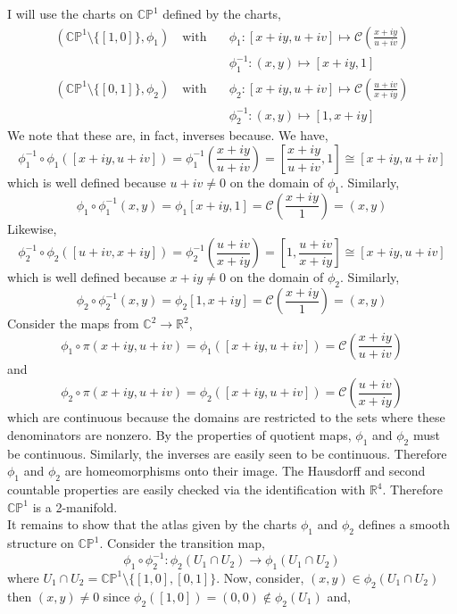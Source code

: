 \documentclass[12pt]{extarticle}
\newcommand{\C}{\mathbb{C}}
\newcommand{\R}{\mathbb{R}}
\newcommand{\sm}{\! \setminus \!}
\newcommand{\CP}{\mathbb{CP}}
\begin{document}
\begin{enumerate}
I will use the charts on $\CP^1$ defined by the charts,
\begin{align*}
(\CP^1 \sm \{[1, 0]\}, \phi_1) \quad \text{with} \quad & \phi_1 : [x + i y, u + i v] \mapsto \mathcal{C}\left(\frac{x + iy}{u + iv}\right)
\\
& \phi_1^{-1} : (x, y) \mapsto [x + i y, 1]
\\
(\CP^1 \sm \{[0, 1]\}, \phi_2) \quad \text{with} \quad & \phi_2 : [x + i y, u + i v] \mapsto \mathcal{C}\left(\frac{u + iv}{x + iy}\right)
\\
& \phi_2^{-1} : (x, y) \mapsto [1, x + i y]
\end{align*}
We note that these are, in fact, inverses because. We have,
\[\phi_1^{-1}\circ \phi_1([x + iy, u + i v]) = \phi_1^{-1}\left(\frac{x + i y}{u + i v}\right) = \left[\frac{x + iy}{u + iv},1\right] \cong [x + iy, u + iv]\]
which is well defined because $u + i v \neq 0$ on the domain of $\phi_1$. Similarly,
\[\phi_1\circ\phi_1^{-1}\left(x, y\right) = \phi_1[x + iy,1] = \mathcal{C} \left(\frac{x + iy}{1}\right) = (x, y)\]
Likewise,
\[\phi_2^{-1}\circ \phi_2([u + iv, x + i y]) = \phi_2^{-1}\left(\frac{u + i v}{x + i y}\right) = \left[1, \frac{u + iv}{x + iy}\right] \cong [x + iy, u + iv]\]
which is well defined because $x + i y \neq 0$ on the domain of $\phi_2$. Similarly,
\[\phi_2 \circ \phi_2^{-1} \left(x, y\right) = \phi_2[1, x + iy] = \mathcal{C} \left(\frac{x + iy}{1}\right) = (x, y)\]
Consider the maps from $\C^2 \to \R^2$,
\[ \phi_1 \circ \pi(x + i y, u + i v) = \phi_1([x + i y, u + i v]) = \mathcal{C}\left(\frac{x + iy}{u + iv}\right) \]
and 
\[ \phi_2 \circ \pi(x + i y, u + i v) = \phi_2([x + i y, u + i v]) = \mathcal{C}\left(\frac{u + iv}{x + iy}\right) \]
which are continuous because the domains are restricted to the sets where these denominators are nonzero. By the properties of quotient maps, $\phi_1$ and $\phi_2$ must be continuous. Similarly, the inverses are easily seen to be continuous. Therefore $\phi_1$ and $\phi_2$ are homeomorphisms onto their image. The Hausdorff and second countable properties are easily checked via the identification with $\R^4$. Therefore $\CP^1$ is a 2-manifold. \bigskip \\
It remains to show that the atlas given by the charts $\phi_1$ and $\phi_2$ defines a smooth structure on $\CP^1$. Consider the transition map, 
\[ \phi_1 \circ \phi_2^{-1} : \phi_2(U_1 \cap U_2) \to \phi_1(U_1 \cap U_2) \]
where $U_1 \cap U_2 = \CP^1 \sm \{[1,0], [0,1]\}$. Now, consider, $(x,y) \in \phi_2(U_1 \cap U_2)$ then $(x, y) \neq 0$ since $\phi_2([1, 0]) = (0, 0) \notin \phi_2(U_1)$ and,

\end{enumerate}
\end{document}

